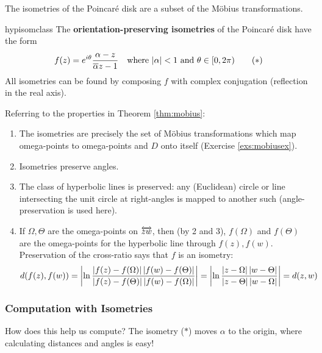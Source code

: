 

The isometries of the Poincaré disk are a subset of the Möbius transformations.

\begin{thm}{}{hypisomclass}
	The \textbf{orientation-preserving\footnotemark{} isometries} of the Poincaré disk have the form
	\[
		f(z)=e^{i\theta}\frac{\alpha-z}{\overline{\alpha} z-1}
		\quad\text{where $\left| \alpha\right|<1$ and $\theta\in[0,2\pi)$}
		\tag{$\ast$}
	\]
	All isometries can be found by composing $f$ with complex conjugation (reflection in the real axis).
\end{thm}



Referring to the properties in Theorem \ref{thm:mobius}:
\begin{enumerate}
  \item The isometries are precisely the set of Möbius transformations which map omega-points to omega-points and $D$ onto itself (Exercise \ref{exs:mobiusex}).
  \item Isometries preserve angles.
  \item The class of hyperbolic lines is preserved: any (Euclidean) circle or line intersecting the unit circle at right-angles is mapped to another such (angle-preservation is used here). 
  \item If $\Omega,\Theta$ are the omega-points on $\overleftrightarrow{zw}$, then (by 2 and 3), $f(\Omega)$ and $f(\Theta)$ are the omega-points for the hyperbolic line through $f(z),f(w)$. Preservation of the cross-ratio says that $f$ is an isometry:
  \[
  	d(f(z),f(w))=\left| \ln\frac{\left| f(z)-f(\Omega)\right|\left| f(w)-f(\Theta)\right|}{\left| f(z)-f(\Theta)\right|\left| f(w)-f(\Omega)\right|}\right|= \left| \ln\frac{\left| z-\Omega\right|\left| w-\Theta\right|}{\left| z-\Theta\right|\left| w-\Omega\right|}\right|=d(z,w)
  \]
\end{enumerate}


\subsubsection*{Computation with Isometries}

How does this help us compute? The isometry ($\ast$) moves $\alpha$ to the origin, where calculating distances and angles is easy! %


